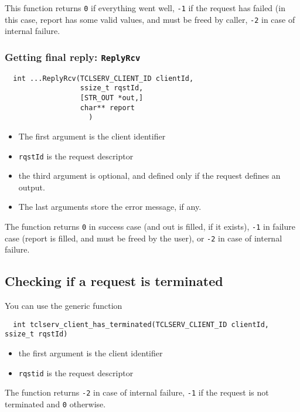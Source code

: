 This function returns \texttt{0}  if everything went well,  \texttt{-1} if the
request has failed (in this case, report has some valid values, and must be
freed by caller, \texttt{-2} in case of internal failure.


\subsubsection{Getting final reply: \texttt{ReplyRcv}}

\begin{center}\begin{cartouche}\small\begin{verbatim}
  int ...ReplyRcv(TCLSERV_CLIENT_ID clientId,
                  ssize_t rqstId, 
                  [STR_OUT *out,]
                  char** report
					)
\end{verbatim}\end{cartouche}\end{center}


\begin{itemize}
\item The first argument is the client identifier

\item \texttt{rqstId} is the request descriptor

\item the third argument is optional, and defined only if the request defines
an output.

\item The last arguments store the error message, if any.
\end{itemize}

The function returns \texttt{0} in success case (and out is filled, if it
exists), \texttt{-1} in failure case (report is filled, and must be freed by
the user), or \texttt{-2} in case of internal failure.

\subsection{Checking if a request is terminated}

You can use the generic function 

\begin{center}\begin{cartouche}\small\begin{verbatim}
  int tclserv_client_has_terminated(TCLSERV_CLIENT_ID clientId, ssize_t rqstId)
\end{verbatim}\end{cartouche}\end{center}

\begin{itemize}
\item the first argument is the client identifier
\item \texttt{rqstid} is the request descriptor
\end{itemize}

The function returns \texttt{-2} in case of internal failure, \texttt{-1} if
the request is not terminated and \texttt{0} otherwise.
